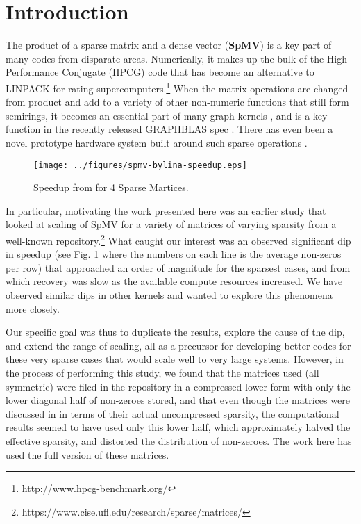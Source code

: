 \section{Introduction}\label{sec:spmv-intro}

The product of a sparse matrix and a dense vector (\textbf{SpMV}) is a key part of many codes from disparate areas. Numerically, it makes up the bulk of the High Performance Conjugate (HPCG) \cite{techbib:hpcg-snl-dongarra} code that has become an alternative to LINPACK for rating supercomputers.\footnote{http://www.hpcg-benchmark.org/} When the matrix operations are changed from product and add to a variety of other non-numeric functions that still form semirings, it becomes an essential part of many graph kernels \cite{bigdata:doi:10.1137/1.9780898719918}, and is a key function in the recently released GRAPHBLAS spec \cite{http://graphblas.org/index.php?title=Graph_BLAS_Forum}. There has even been a novel prototype hardware system built around such sparse operations \cite{techbib:song-hpec}.

\begin{figure}\begin{centering}
\texttt{[image: ../figures/spmv-bylina-speedup.eps]}
\caption{Speedup from \cite{techbib:6933066} for 4 Sparse Martices.}
\label{fig:spmv-bylina-speedup}
\end{centering}\end{figure}

In particular, motivating the work presented here was an earlier study \cite{techbib:6933066} that looked at scaling of SpMV for a variety of matrices of varying sparsity from a well-known repository.\footnote{https://www.cise.ufl.edu/research/sparse/matrices/} What caught our interest was an observed significant dip in speedup (see Fig. \ref{fig:spmv-bylina-speedup} where the numbers on each line is the average non-zeros per row) that approached an order of magnitude  for the sparsest cases, and from which recovery was slow as the available compute resources increased. We have observed similar dips in other kernels and wanted to explore this phenomena more closely. 

Our specific goal was thus to duplicate the results, explore the cause of the dip, and extend the range of scaling, all as a precursor for developing better codes for these very sparse cases that would scale well to very large systems. However, in the process of performing this study, we found that the matrices used (all symmetric) were filed in the repository in a compressed lower form with only the lower diagonal half of non-zeroes stored, and that even though the matrices were discussed in \cite{techbib:6933066} in terms of their actual uncompressed sparsity, the computational results seemed to have used only this lower half, which approximately halved the effective sparsity, and distorted the distribution of non-zeroes.  The work here has used the full version of these matrices.

